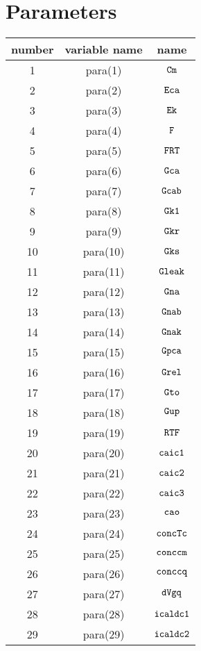 \documentclass{article}
\begin{document}
\section{Parameters}
\begin{center}
\begin{tabular}{|c|c|c|}
\hline
number & variable name & name \\
\hline
1 & para(1)  & $\mbox{\tt Cm}$ \\ 
2 & para(2)  & $\mbox{\tt Eca}$ \\ 
3 & para(3)  & $\mbox{\tt Ek}$ \\ 
4 & para(4)  & $\mbox{\tt F}$ \\ 
5 & para(5)  & $\mbox{\tt FRT}$ \\ 
6 & para(6)  & $\mbox{\tt Gca}$ \\ 
7 & para(7)  & $\mbox{\tt Gcab}$ \\ 
8 & para(8)  & $\mbox{\tt Gk1}$ \\ 
9 & para(9)  & $\mbox{\tt Gkr}$ \\ 
10 & para(10)  & $\mbox{\tt Gks}$ \\ 
11 & para(11)  & $\mbox{\tt Gleak}$ \\ 
12 & para(12)  & $\mbox{\tt Gna}$ \\ 
13 & para(13)  & $\mbox{\tt Gnab}$ \\ 
14 & para(14)  & $\mbox{\tt Gnak}$ \\ 
15 & para(15)  & $\mbox{\tt Gpca}$ \\ 
16 & para(16)  & $\mbox{\tt Grel}$ \\ 
17 & para(17)  & $\mbox{\tt Gto}$ \\ 
18 & para(18)  & $\mbox{\tt Gup}$ \\ 
19 & para(19)  & $\mbox{\tt RTF}$ \\ 
20 & para(20)  & $\mbox{\tt caic1}$ \\ 
21 & para(21)  & $\mbox{\tt caic2}$ \\ 
22 & para(22)  & $\mbox{\tt caic3}$ \\ 
23 & para(23)  & $\mbox{\tt cao}$ \\ 
24 & para(24)  & $\mbox{\tt concTc}$ \\ 
25 & para(25)  & $\mbox{\tt conccm}$ \\ 
26 & para(26)  & $\mbox{\tt conccq}$ \\ 
27 & para(27)  & $\mbox{\tt dVgq}$ \\ 
28 & para(28)  & $\mbox{\tt icaldc1}$ \\ 
29 & para(29)  & $\mbox{\tt icaldc2}$ \\ 

\end{tabular}
\end{center}
\end{document}
